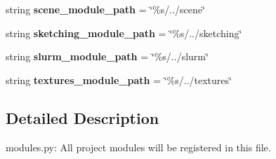 \begin{DoxyCompactItemize}
\item 
string {\bfseries scene\+\_\+module\+\_\+path} = \char`\"{}\%s/../scene\char`\"{}\hypertarget{namespacemeshy__modules_a217142ede0ddc7e5ca09e87eb8ae5ca5}{}\label{namespacemeshy__modules_a217142ede0ddc7e5ca09e87eb8ae5ca5}

\item 
string {\bfseries sketching\+\_\+module\+\_\+path} = \char`\"{}\%s/../sketching\char`\"{}\hypertarget{namespacemeshy__modules_aad26cad662fc91e60aa2dc866123a441}{}\label{namespacemeshy__modules_aad26cad662fc91e60aa2dc866123a441}

\item 
string {\bfseries slurm\+\_\+module\+\_\+path} = \char`\"{}\%s/../slurm\char`\"{}\hypertarget{namespacemeshy__modules_a2606c9bb1ccda77cb37f7e950541dc69}{}\label{namespacemeshy__modules_a2606c9bb1ccda77cb37f7e950541dc69}

\item 
string {\bfseries textures\+\_\+module\+\_\+path} = \char`\"{}\%s/../textures\char`\"{}\hypertarget{namespacemeshy__modules_a0846fb91e4501e056ca97fd8844ff72f}{}\label{namespacemeshy__modules_a0846fb91e4501e056ca97fd8844ff72f}

\end{DoxyCompactItemize}


\subsection{Detailed Description}
\begin{DoxyVerb}modules.py:
All project modules will be registered in this file.
\end{DoxyVerb}
 